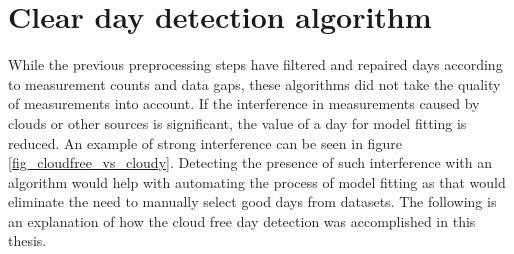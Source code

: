 








\section{Clear day detection algorithm}
\label{clearskyalgo_chapter}
While the previous preprocessing steps have filtered and repaired days according to measurement counts and data gaps, these algorithms did not take the quality of measurements into account. If the interference in measurements caused by clouds or other sources is significant, the value of a day for model fitting is reduced. An example of strong interference can be seen in figure \ref{fig_cloudfree_vs_cloudy}. Detecting the presence of such interference with an algorithm would help with automating the process of model fitting as that would eliminate the need to manually select good days from datasets. The following is an explanation of how the cloud free day detection was accomplished in this thesis.




